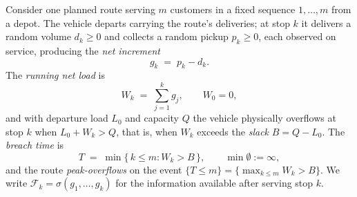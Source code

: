 \documentclass[preprint,authoryear,12pt]{elsarticle}
\theoremstyle{definition}
\theoremstyle{remark}
\begin{document}
Consider one planned route serving $m$ customers in a fixed sequence
$1,\dots,m$ from a depot. The vehicle departs carrying the route's
deliveries; at stop $k$ it delivers a random volume $d_k \ge 0$ and
collects a random pickup $p_k \ge 0$, each observed on service,
producing the \emph{net increment}
\begin{equation}\label{eq:increment}
  g_k \;=\; p_k - d_k .
\end{equation}
The \emph{running net load} is
\begin{equation}\label{eq:runsum}
  W_k \;=\; \sum_{j=1}^{k} g_j , \qquad W_0 = 0 ,
\end{equation}
and with departure load $L_0$ and capacity $Q$ the vehicle physically
overflows at stop $k$ when $L_0 + W_k > Q$, that is, when $W_k$ exceeds
the \emph{slack} $B = Q - L_0$. The \emph{breach time} is
\begin{equation}\label{eq:breach}
  T \;=\; \min\{\,k \le m : W_k > B\,\}, \qquad \min\emptyset := \infty ,
\end{equation}
and the route \emph{peak-overflows} on the event
$\{T \le m\} = \{\max_{k\le m} W_k > B\}$. We write
$\mathcal F_k = \sigma(g_1,\dots,g_k)$ for the information available
after serving stop $k$.
\end{document}
